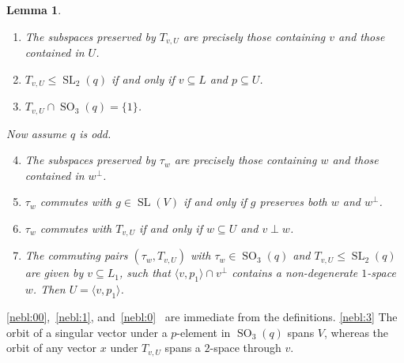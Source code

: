 \documentclass[12pt]{amsart}
\newtheorem{lemma}[theorem]{Lemma}
\theoremstyle{definition}
\newcommand{\bpf}{\noindent{\bf Proof}\hspace{7pt}}
\newcommand{\ble}{\begin{lemma}}
\newcommand{\ele}{\end{lemma}}
\newcommand{\sbe}{\subseteq}
\DeclareMathOperator{\SL}{SL}
\DeclareMathOperator{\SO}{SO}
\newcommand{\amgrpH}{{\mathbf{H}}}
\begin{document}
\ble\label{lem:non-classical edges basic lemma}
\begin{enumerate}
\item\label{nebl:00} The subspaces preserved by $T_{v,U}$ are precisely those containing $v$ and those contained in $U$.

\item\label{nebl:1} $T_{v,U}\le \SL_2(q)$ if and only if $v\sbe L$ and $p\sbe U$.

\item\label{nebl:3} $T_{v,U}\cap \SO_3(q)=\{1\}$.

\end{enumerate}
Now assume $q$ is odd.
\begin{enumerate}
\setcounter{enumi}{3}
\item\label{nebl:0} The subspaces preserved by $\tau_w$ are precisely those containing $w$ and those contained in $w^\perp$.

\item\label{nebl:1.5} $\tau_w$ commutes with $g\in \SL(V)$ if and only if $g$ preserves both $w$ and $w^\perp$.
\item\label{nebl:2} $\tau_w$ commutes with $T_{v,U}$ if and only if $w\sbe U$ and $v\perp w$.

\item\label{nebl:4}  The commuting pairs $(
\tau_w,T_{v,U})$ with $\tau_w\in \SO_3(q)$ and $T_{v,U}\le \SL_2(q)$  are given by 
$v\sbe L_1$, such that $\langle v,p_1\rangle\cap v^\perp$ contains a non-degenerate $1$-space $w$. Then $U=\langle v,p_1\rangle$.
\end{enumerate}


\ele
\bpf
\eqref{nebl:00},~\eqref{nebl:1}, and~\eqref{nebl:0}~ are immediate from the definitions.
\eqref{nebl:3}
The orbit of a singular vector under a $p$-element in $\SO_3(q)$ spans $V$, whereas the orbit of any vector $x$ under $T_{v,U}$ spans a $2$-space through $v$.
\end{document}

